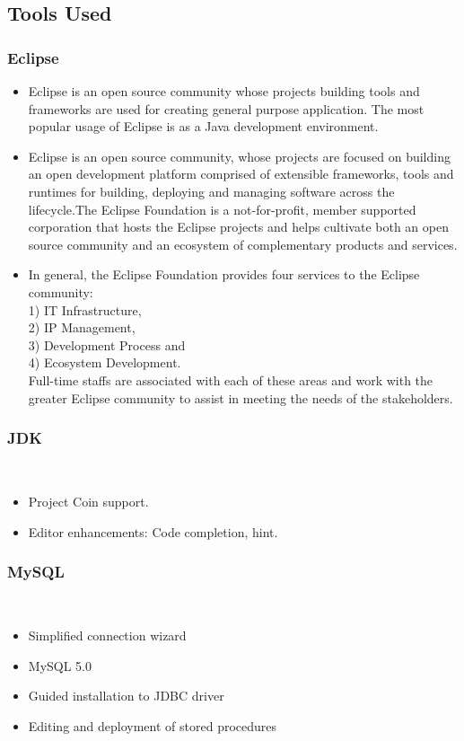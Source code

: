 \documentclass[12pt,a4paper]{article}
\begin{document}
\subsection{Tools Used}
\subsubsection{Eclipse}
\begin{itemize}
\item Eclipse is an open source community whose projects building tools and frameworks are used for creating general purpose application. The most popular usage of Eclipse is as a Java development environment.
\item Eclipse is an open source community, whose projects are focused on building an open development platform comprised of extensible frameworks, tools and runtimes for building, deploying and managing software across the lifecycle.The Eclipse Foundation is a not-for-profit, member supported corporation that hosts the Eclipse projects and helps cultivate both an open source community and an ecosystem of complementary products and services.
\item In general, the Eclipse Foundation provides four services to the Eclipse community:\\
 1) IT Infrastructure,\\ 
 2) IP Management,\\
 3) Development Process and\\ 
 4) Ecosystem Development.\\
 Full-time staffs are associated with each of these areas and work with the greater Eclipse community to assist in meeting the needs of the stakeholders.
 \end{itemize}
 
\subsubsection{JDK}\\
\begin{itemize}
\item Project Coin support.
\item Editor enhancements: Code completion, hint.
\end{itemize}

\subsubsection{MySQL}\\
\begin{itemize}
\item Simplified connection wizard
\item MySQL 5.0
\item Guided installation to JDBC driver
\item Editing and deployment of stored procedures
\end{itemize}
\end{document}
